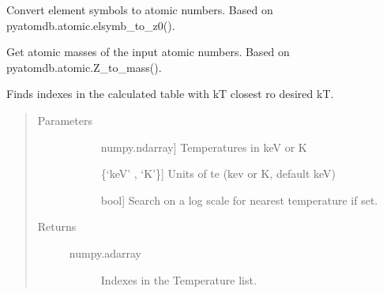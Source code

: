 \documentclass[letterpaper,10pt,english]{sphinxmanual}
\begin{document}
\begin{fulllineitems}
\label{\detokenize{prepare_pyatomdb:modules.prepare_pyatomdb.elsymbs_to_z0s}}
Convert element symbols to atomic numbers.
Based on pyatomdb.atomic.elsymb\_to\_z0().

\end{fulllineitems}


\begin{fulllineitems}
\label{\detokenize{prepare_pyatomdb:modules.prepare_pyatomdb.get_atomic_masses}}
Get atomic masses of the input atomic numbers.
Based on pyatomdb.atomic.Z\_to\_mass().

\end{fulllineitems}


\begin{fulllineitems}
\label{\detokenize{prepare_pyatomdb:modules.prepare_pyatomdb.get_index}}
Finds indexes in the calculated table with kT closest ro desired kT.
\begin{quote}\begin{description}
\item[{Parameters}] \leavevmode\begin{description}
\item[{}] \leavevmode{[}numpy.ndarray{]}
Temperatures in keV or K

\item[{}] \leavevmode{[}\{‘keV’ , ‘K’\}{]}
Units of te (kev or K, default keV)

\item[{}] \leavevmode{[}bool{]}
Search on a log scale for nearest temperature if set.

\end{description}

\item[{Returns}] \leavevmode\begin{description}
\item[{numpy.adarray}] \leavevmode
Indexes in the Temperature list.

\end{description}

\end{description}\end{quote}

\end{fulllineitems}
\end{document}
